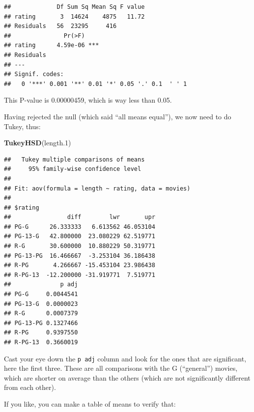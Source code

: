 \documentclass[]{tufte-book}
\newenvironment{Shaded}{}{}
\newcommand{\DataTypeTok}[1]{\textcolor[rgb]{0.56,0.13,0.00}{#1}}
\newcommand{\FloatTok}[1]{\textcolor[rgb]{0.25,0.63,0.44}{#1}}
\newcommand{\KeywordTok}[1]{\textcolor[rgb]{0.00,0.44,0.13}{\textbf{#1}}}
\newcommand{\NormalTok}[1]{#1}
\newcommand{\OperatorTok}[1]{\textcolor[rgb]{0.40,0.40,0.40}{#1}}
\newcommand{\StringTok}[1]{\textcolor[rgb]{0.25,0.44,0.63}{#1}}
\theoremstyle{definition}
\theoremstyle{definition}
\theoremstyle{definition}
\theoremstyle{remark}
\begin{document}
\begin{verbatim}
##             Df Sum Sq Mean Sq F value
## rating       3  14624    4875   11.72
## Residuals   56  23295     416        
##               Pr(>F)    
## rating      4.59e-06 ***
## Residuals               
## ---
## Signif. codes:  
##   0 '***' 0.001 '**' 0.01 '*' 0.05 '.' 0.1  ' ' 1
\end{verbatim}

This P-value is 0.00000459, which is way less than 0.05.

Having rejected the null (which said ``all means equal''), we now need
to do Tukey, thus:

\begin{Shaded}
\begin{Highlighting}[]
\KeywordTok{TukeyHSD}\NormalTok{(length}\FloatTok{.1}\NormalTok{)}
\end{Highlighting}
\end{Shaded}

\begin{verbatim}
##   Tukey multiple comparisons of means
##     95% family-wise confidence level
## 
## Fit: aov(formula = length ~ rating, data = movies)
## 
## $rating
##                diff        lwr       upr
## PG-G      26.333333   6.613562 46.053104
## PG-13-G   42.800000  23.080229 62.519771
## R-G       30.600000  10.880229 50.319771
## PG-13-PG  16.466667  -3.253104 36.186438
## R-PG       4.266667 -15.453104 23.986438
## R-PG-13  -12.200000 -31.919771  7.519771
##              p adj
## PG-G     0.0044541
## PG-13-G  0.0000023
## R-G      0.0007379
## PG-13-PG 0.1327466
## R-PG     0.9397550
## R-PG-13  0.3660019
\end{verbatim}

Cast your eye down the \texttt{p\ adj} column and look for the ones that
are significant, here the first three. These are all comparisons with
the G (``general'') movies, which are shorter on average than the others
(which are not significantly different from each other).

If you like, you can make a table of means to verify that:

\begin{Shaded}
\end{Shaded}
\end{document}
